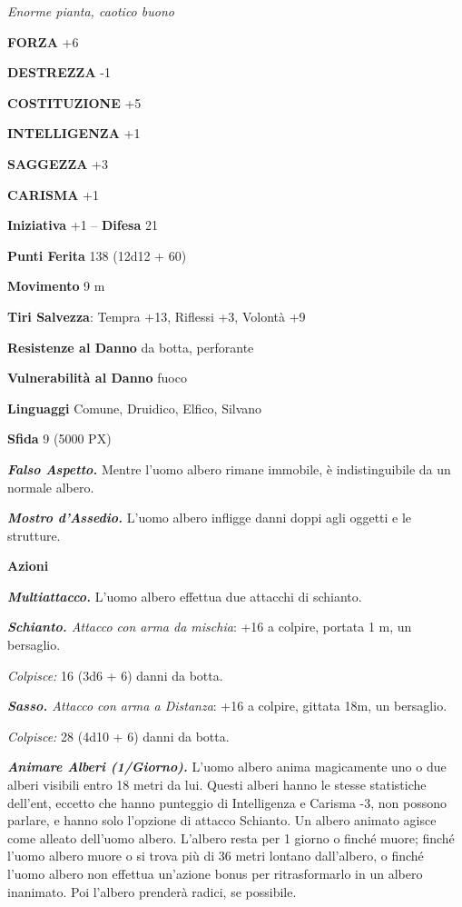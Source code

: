 \begin{multicols}{2}
	\textit{Enorme pianta, caotico buono}

	\textbf{FORZA} +6

	\textbf{DESTREZZA} -1

	\textbf{COSTITUZIONE} +5

	\textbf{INTELLIGENZA} +1

	\textbf{SAGGEZZA} +3

	\textbf{CARISMA} +1

	\textbf{Iniziativa} +1 -- \textbf{Difesa} 21

	\textbf{Punti Ferita} 138 (12d12 + 60)

	\textbf{Movimento} 9 m

	\textbf{Tiri Salvezza}: Tempra +13, Riflessi +3, Volontà +9

	\textbf{Resistenze al Danno} da botta, perforante

	\textbf{Vulnerabilità al Danno} fuoco

	\textbf{Linguaggi} Comune, Druidico, Elfico, Silvano

	\textbf{Sfida} 9 (5000 PX)

	\textit{\textbf{Falso Aspetto.}} Mentre l'uomo albero rimane immobile, è indistinguibile da un normale albero.

	\textit{\textbf{Mostro d'Assedio.}} L'uomo albero infligge danni doppi agli oggetti e le strutture.

	\textbf{Azioni}

	\textit{\textbf{Multiattacco.}} L'uomo albero effettua due attacchi di schianto.

	\textit{\textbf{Schianto.} Attacco con arma da mischia}: +16 a colpire, portata 1 m, un bersaglio.

	\textit{Colpisce:} 16 (3d6 + 6) danni da botta.

	\textit{\textbf{Sasso.} Attacco con arma a Distanza}: +16 a colpire, gittata 18m, un bersaglio.

	\textit{Colpisce:} 28 (4d10 + 6) danni da botta.

	\textit{\textbf{Animare Alberi (1/Giorno).}} L'uomo albero anima magicamente uno o due alberi visibili entro 18 metri da lui. Questi alberi hanno le stesse statistiche dell'ent, eccetto che hanno punteggio di Intelligenza e Carisma -3, non possono parlare, e hanno solo l'opzione di attacco Schianto. Un albero animato agisce come alleato dell'uomo albero. L'albero resta per 1 giorno o finché muore; finché l'uomo albero muore o si trova più di 36 metri lontano dall'albero, o finché l'uomo albero non effettua un'azione bonus per ritrasformarlo in un albero inanimato. Poi l'albero prenderà radici, se possibile.


\end{multicols}

